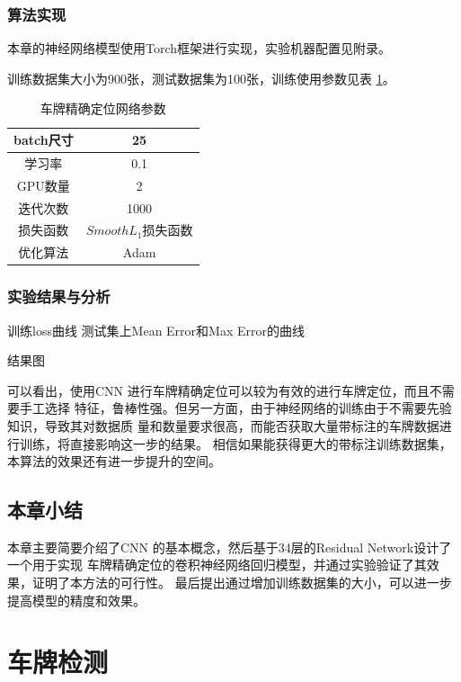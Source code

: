 \subsection{算法实现}

本章的神经网络模型使用Torch框架进行实现，实验机器配置见附录。

训练数据集大小为900张，测试数据集为100张，训练使用参数见表 \ref{Tab:LocationArgs}。

\begin{table}[ht]
\centering
\caption{车牌精确定位网络参数}\label{Tab:LocationArgs}
\begin{tabular}{|c|c|}
\hline
batch尺寸 & 25 \\
\hline
学习率 & 0.1 \\
\hline
GPU数量 & 2 \\
\hline
迭代次数 & 1000 \\
\hline
损失函数 & $Smooth L_1$损失函数 \\
\hline
优化算法 & Adam\cite{Kingma:2014us} \\
\hline
\end{tabular}
\end{table}

\subsection{实验结果与分析}

训练loss曲线
测试集上Mean Error和Max Error的曲线

结果图

可以看出，使用CNN 进行车牌精确定位可以较为有效的进行车牌定位，而且不需要手工选择
特征，鲁棒性强。但另一方面，由于神经网络的训练由于不需要先验知识，导致其对数据质
量和数量要求很高，而能否获取大量带标注的车牌数据进行训练，将直接影响这一步的结果。
相信如果能获得更大的带标注训练数据集，本算法的效果还有进一步提升的空间。

\section{本章小结}

本章主要简要介绍了CNN 的基本概念，然后基于34层的Residual Network设计了一个用于实现
车牌精确定位的卷积神经网络回归模型，并通过实验验证了其效果，证明了本方法的可行性。
最后提出通过增加训练数据集的大小，可以进一步提高模型的精度和效果。

\chapter{车牌检测}

